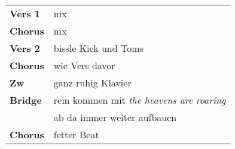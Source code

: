 
\begin{tabular}{p{1.6cm}l}
	\textbf{Vers 1} & nix                                              \\
	\textbf{Chorus} & nix                                              \\
	\textbf{Vers 2} & bissle Kick und Toms                             \\
	\textbf{Chorus} & wie Vers davor                                   \\
	\textbf{Zw}     & ganz ruhig Klavier                               \\
	\textbf{Bridge} & rein kommen mit \textit{the heavens are roaring} \\
	                & ab da immer weiter aufbauen                      \\
	\textbf{Chorus} & fetter Beat                                      \\
\end{tabular}
